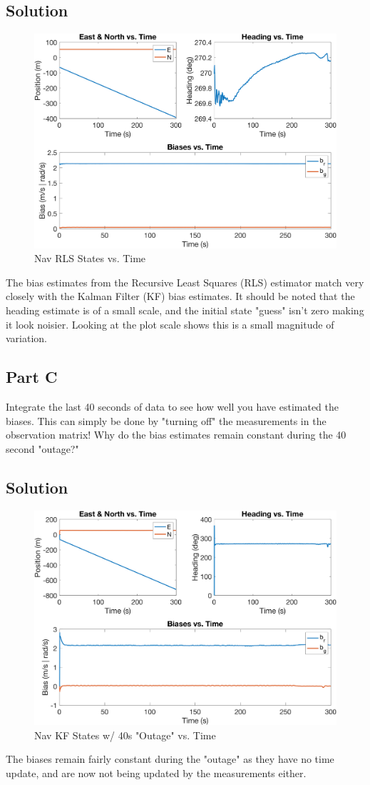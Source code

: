 \documentclass{article}
\begin{document}
\subsection*{Solution}
\begin{figure}[H]
    \centering
    \includegraphics[width=0.75\linewidth]{../figures/p3b.png}
    \caption{Nav RLS States vs. Time}\label{fig:p3b}
\end{figure}
The bias estimates from the Recursive Least Squares (RLS) estimator match very closely with the Kalman Filter (KF) bias estimates.  It should be 
noted that the heading estimate is of a small scale, and the initial state "guess" isn't zero making it look noisier.  Looking at the plot scale 
shows this is a small magnitude of variation.

\subsection*{Part C}
Integrate the last 40 seconds of data to see how well you have estimated the biases.  This can simply be done by "turning off" the measurements 
in the observation matrix! Why do the bias estimates remain constant during the 40 second "outage?"
\subsection*{Solution}
\begin{figure}[H]
    \centering
    \includegraphics[width=0.75\linewidth]{../figures/p3c.png}
    \caption{Nav KF States w/ 40s "Outage" vs. Time}\label{fig:p3c}
\end{figure}
The biases remain fairly constant during the "outage" as they have no time update, and are now not being updated by the measurements either.
\end{document}
